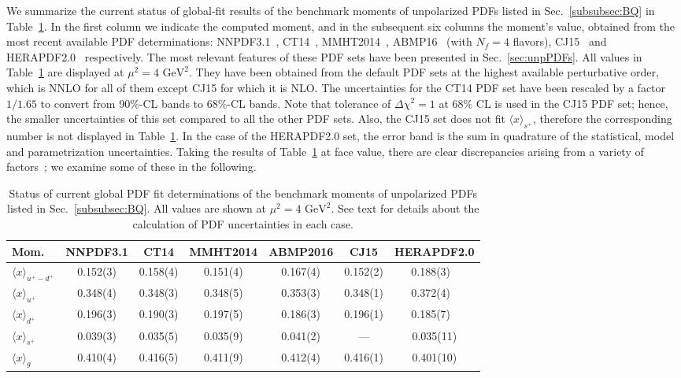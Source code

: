 We summarize the current status of global-fit results of the benchmark
moments of unpolarized PDFs listed in Sec.~\ref{subsubsec:BQ} 
in Table~\ref{tab:unpPDFmoms}.
%
In the first column we indicate the computed moment, and in the subsequent 
six columns the moment's value, obtained from the most recent available PDF 
determinations: NNPDF3.1~\cite{Ball:2017nwa},
CT14~\cite{Dulat:2015mca}, MMHT2014~\cite{Harland-Lang:2014zoa},
ABMP16~\cite{Alekhin:2017kpj} (with $N_f=4$ flavors), 
CJ15~\cite{Accardi:2016qay} and 
HERAPDF2.0~\cite{Abramowicz:2015mha} respectively.
%
The most relevant features of these PDF sets have been presented in 
Sec.~\ref{sec:unpPDFs}.
%
All values in Table~\ref{tab:unpPDFmoms} are displayed
at $\mu^2=4\mbox{ GeV}^2$. 
%
They have been obtained from the default PDF sets at the highest available 
perturbative order, which is NNLO for all of them except CJ15
for which it is NLO.
%
The uncertainties for the CT14 PDF set have been rescaled by a factor $1/1.65$ 
to convert from  90\%-CL bands to  68\%-CL bands.
%
Note that tolerance of $\Delta \chi^2=1$ at 68\% CL is used in the CJ15 PDF 
set; hence, the smaller uncertainties of this set compared to all the other 
PDF sets.
%
Also, the CJ15 set does  not fit $\langle x \rangle_{s^+}$, therefore the 
corresponding number is not displayed in Table~\ref{tab:unpPDFmoms}. 
%
In the case of the HERAPDF2.0 set, the error band is the sum in quadrature 
of the statistical, model and parametrization uncertainties.
%
Taking the results of Table~\ref{tab:unpPDFmoms} at face value,
there are clear discrepancies arising from a variety of 
factors~\cite{Butterworth:2015oua,Accardi:2016ndt};
we examine some of these in the following. 

\begin{table}[!t]
\centering
\renewcommand{\arraystretch}{1.2}
\begin{tabular}{lcccccc}
\toprule
Mom. 
& NNPDF3.1 & CT14 & MMHT2014 & ABMP2016 & CJ15 & HERAPDF2.0 \\
\midrule
$\langle x \rangle_{u^+-d^+}$ 
& 0.152(3) & 0.158(4) & 0.151(4) & 0.167(4) & 0.152(2) & 0.188(3)\ \,\\
$\langle x \rangle_{u^+}$    
& 0.348(4) & 0.348(3) & 0.348(5) & 0.353(3) & 0.348(1) & 0.372(4)\ \,\\
$\langle x \rangle_{d^+}$    
& 0.196(3) & 0.190(3) & 0.197(5) & 0.186(3) & 0.196(1) & 0.185(7)\ \,\\
$\langle x \rangle_{s^+}$    
& 0.039(3) & 0.035(5) & 0.035(9) & 0.041(2) & ---   & 0.035(11)\\
$\langle x \rangle_{g}$     
& 0.410(4) & 0.416(5) & 0.411(9) & 0.412(4) & 0.416(1) & 0.401(10)\\
\bottomrule
\end{tabular}
\caption{\small Status of current global PDF fit determinations of the 
benchmark moments of unpolarized PDFs listed in Sec.~\ref{subsubsec:BQ}.
All values are shown at $\mu^2=4\mbox{ GeV}^2$.
%
See text for details about the calculation of PDF uncertainties in each case.
}
\label{tab:unpPDFmoms}
\end{table}

